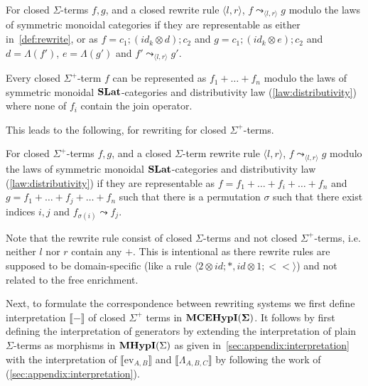 \begin{definition}
	For closed $\Sigma$-terms $f,g$, and a closed rewrite rule $\langle l, r \rangle$, $f \leadsto_{\langle l, r \rangle} g$ modulo the laws of symmetric monoidal categories if they are representable as either in~\autoref{def:rewrite}, or as
	$
		f = c_{1};(id_{k} \otimes d);c_{2} $ and $ g = c_{1};(id_{k} \otimes e);c_{2}
	$
	and $d = \Lambda(f')$, $e = \Lambda(g')$ and $f' \leadsto_{\langle l, r \rangle} g'$.
\end{definition}
\begin{lemma}
	\label{lemma:normal_form}
	Every closed $\Sigma^{+}$-term $f$ can be represented as
	$
		f_{1} + \ldots + f_{n}
	$ modulo the laws of symmetric monoidal $\mathbf{SLat}$-categories and distributivity law (\autoref{law:distributivity}) where none of $f_{i}$ contain the join operator.
\end{lemma}
This leads to the following, for rewriting for closed $\Sigma^{+}$-terms.
\begin{definition}
	For closed $\Sigma^{+}$-terms $f,g$, and a closed $\Sigma$-term rewrite rule $\langle l, r \rangle$, $f \leadsto_{\langle l, r \rangle} g$ modulo the laws of symmetric monoidal $\mathbf{SLat}$-categories and distributivity law (\autoref{law:distributivity}) if they are representable as
	$
		f = f_{1} + \ldots + f_{i} + \ldots + f_{n} $ and $ g = f_{1} + \ldots + f_{j} + \ldots + f_{n}
	$
	such that there is a permutation $\sigma$ such that there exist indices $i,j$ and $f_{\sigma(i)} \leadsto f_{j}$.
\end{definition}
Note that the rewrite rule consist of closed $\Sigma$-terms and not closed $\Sigma^{+}$-terms, i.e. neither $l$ nor $r$ contain any $+$.
This is intentional as there rewrite rules are supposed to be domain-specific (like a rule $\langle 2 \otimes id;*, id \otimes 1; <\!\!< \rangle$) and not related to the free enrichment.

Next, to formulate the correspondence between rewriting systems we first define interpretation $\llbracket - \rrbracket$ of closed $\Sigma^{+}$ terms in ${\mathbf{MCEHypI(\Sigma)}}$.
It follows by first defining the interpretation of generators by extending the interpretation of plain $\Sigma$-terms as morphisms in $\textbf{MHypI}(\Sigma)$ as given in~\autoref{sec:appendix:interpretation} with the interpretation of $\llbracket \text{ev}_{A,B}\rrbracket$ and $\llbracket \Lambda_{A,B,C} \rrbracket$ by following the work of~\citet{fscd} (\autoref{sec:appendix:interpretation}).

